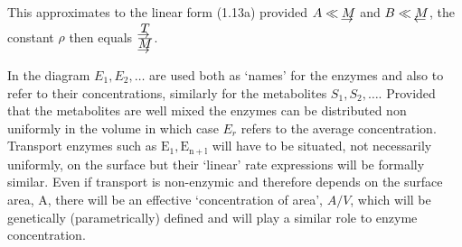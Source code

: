 This approximates to the linear form (1.13a) provided $A \ll \vecur{M}$ and $B \ll \vecul{M}$, the constant $\rho$ then equals $\frac{\vecur{T}}{\vecur{M}}$.

In the diagram $E_{1}, E_{2}, \ldots$ are used both as `names' for the enzymes and also to refer to their concentrations, similarly for the metabolites $S_{1}, S_{2}, \ldots$. Provided that the metabolites are well mixed the enzymes can be distributed non uniformly in the volume in which case $E_{r}$ refers to the average concentration. Transport enzymes such as $\mathrm{E}_{1}, \mathrm{E}_{\mathrm{n+l}}$ will have to be situated, not necessarily uniformly, on the surface but their `linear' rate expressions will be formally similar. Even if transport is non-enzymic and therefore depends on the surface area, A, there will be an effective `concentration of area', $A/V$, which will be genetically (parametrically) defined and will play a similar role to enzyme concentration.

